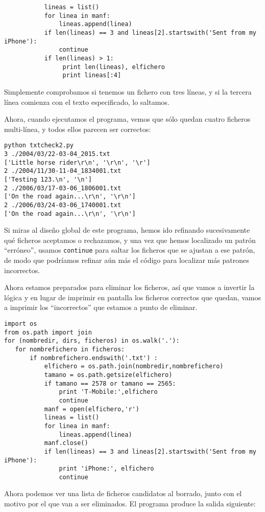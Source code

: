 \beforeverb
\begin{verbatim}
           lineas = list()
           for linea in manf:
               lineas.append(linea)
           if len(lineas) == 3 and lineas[2].startswith('Sent from my iPhone'):
               continue
           if len(lineas) > 1:
                print len(lineas), elfichero
                print lineas[:4]
\end{verbatim}
\afterverb
%
Simplemente comprobamos si tenemos un fichero con tres líneas, y si la tercera
línea comienza con el texto especificado, lo saltamos.

Ahora, cuando ejecutamos el programa, vemos que sólo quedan cuatro ficheros
multi-línea, y todos ellos parecen ser correctos:

\beforeverb
\begin{verbatim}
python txtcheck2.py 
3 ./2004/03/22-03-04_2015.txt
['Little horse rider\r\n', '\r\n', '\r']
2 ./2004/11/30-11-04_1834001.txt
['Testing 123.\n', '\n']
2 ./2006/03/17-03-06_1806001.txt
['On the road again...\r\n', '\r\n']
2 ./2006/03/24-03-06_1740001.txt
['On the road again...\r\n', '\r\n']
\end{verbatim}
\afterverb
%
Si miras al diseño global de este programa,
hemos ido refinando sucesivamente qué ficheros aceptamos o rechazamos,
y una vez que hemos localizado un patrón ``erróneo'', usamos
{\tt continue} para saltar los ficheros que se ajustan a ese patrón, de modo que podríamos
refinar aún más el código para localizar más patrones incorrectos.

Ahora estamos preparados para eliminar los ficheros, así
que vamos a invertir la lógica y en lugar de imprimir en pantalla
los ficheros correctos que quedan, vamos a imprimir los
``incorrectos'' que estamos a punto de eliminar.

\beforeverb
\begin{verbatim}
import os
from os.path import join
for (nombredir, dirs, ficheros) in os.walk('.'):
   for nombrefichero in ficheros:
       if nombrefichero.endswith('.txt') :
           elfichero = os.path.join(nombredir,nombrefichero)
           tamano = os.path.getsize(elfichero)
           if tamano == 2578 or tamano == 2565:
               print 'T-Mobile:',elfichero
               continue
           manf = open(elfichero,'r')
           lineas = list()
           for linea in manf:
               lineas.append(linea)
           manf.close()
           if len(lineas) == 3 and lineas[2].startswith('Sent from my iPhone'):
               print 'iPhone:', elfichero
               continue
\end{verbatim}
\afterverb
%
Ahora podemos ver una lista de ficheros candidatos al
borrado, junto con el motivo por el que van a ser eliminados.
El programa produce la salida siguiente:

